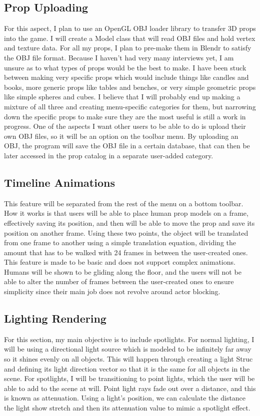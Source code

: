 \documentclass[10pt,twocolumn]{article}
\begin{document}
\subsection{Prop Uploading}
For this aspect, I plan to use an OpenGL OBJ loader library to transfer 3D props into the game. I will create a Model class that will read OBJ files and hold vertex and texture data. For all my props, I plan to pre-make them in Blendr to satisfy the OBJ file format. Because I haven't had very many interviews yet, I am unsure as to what types of props would be the best to make. I have been stuck between making very specific props which would include things like candles and books, more generic props like tables and benches, or very simple geometric props like simple spheres and cubes. I believe that I will probably end up making a mixture of all three and creating menu-specific categories for them, but narrowing down the specific props to make sure they are the most useful is still a work in progress.
One of the aspects I want other users to be able to do is upload their own OBJ files, so it will be an option on the toolbar menu. By uploading an OBJ, the program will save the OBJ file in a certain database, that can then be later accessed in the prop catalog in a separate user-added category. 

\subsection{Timeline Animations}
This feature will be separated from the rest of the menu on a bottom toolbar. How it works is that users will be able to place human prop models on a frame, effectively saving its position, and then will be able to move the prop and save its position on another frame. Using these two points, the object will be translated from one frame to another using a simple translation equation, dividing the amount that has to be walked with 24 frames in between the user-created ones. This feature is made to be basic and does not support complex animations. Humans will be shown to be gliding along the floor, and the users will not be able to alter the number of frames between the user-created ones to ensure simplicity since their main job does not revolve around actor blocking. 

\subsection{Lighting Rendering}
For this section, my main objective is to include spotlights. For normal lighting, I will be using a directional light source which is modeled to be infinitely far away so it shines evenly on all objects. This will happen through creating a light Struc and defining its light direction vector so that it is the same for all objects in the scene. For spotlights, I will be transitioning to point lights, which the user will be able to add to the scene at will. Point light rays fade out over a distance, and this is known as attenuation. Using a light's position, we can calculate the distance the light show stretch and then its attenuation value to mimic a spotlight effect. 
\end{document}
